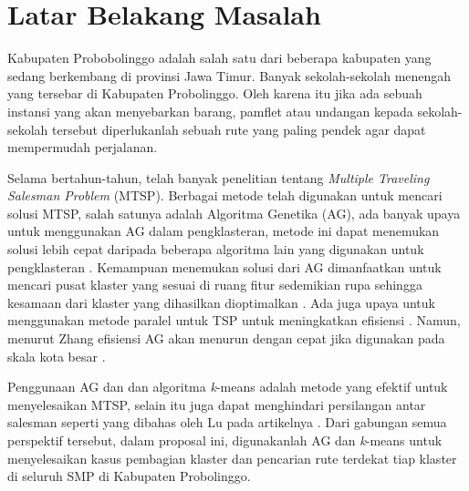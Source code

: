 
\section{Latar Belakang Masalah}

Kabupaten Probobolinggo adalah salah satu dari beberapa kabupaten yang sedang berkembang di provinsi Jawa Timur. Banyak sekolah-sekolah menengah yang tersebar di Kabupaten Probolinggo. Oleh karena itu jika ada sebuah instansi yang akan menyebarkan barang, pamflet atau undangan kepada sekolah-sekolah tersebut diperlukanlah sebuah rute yang paling pendek agar dapat mempermudah perjalanan.

Selama bertahun-tahun, telah banyak penelitian tentang \textit{Multiple Traveling Salesman Problem} (MTSP). Berbagai metode telah digunakan untuk mencari solusi MTSP, salah satunya adalah Algoritma Genetika (AG), ada banyak upaya untuk menggunakan AG dalam pengklasteran, metode ini dapat menemukan solusi lebih cepat daripada beberapa algoritma lain yang digunakan untuk pengklasteran \cite{krishna1999genetic}. Kemampuan menemukan solusi dari AG dimanfaatkan untuk mencari pusat klaster yang sesuai di ruang fitur sedemikian rupa sehingga kesamaan dari klaster yang dihasilkan dioptimalkan \cite{maii2000genetic}. Ada juga upaya untuk menggunakan metode paralel untuk TSP untuk meningkatkan efisiensi \cite{li2016parallel}. Namun, menurut Zhang efisiensi AG akan menurun dengan cepat jika digunakan pada skala kota besar \cite{zhang2014parallel}. 

Penggunaan AG dan dan algoritma \textit{k}-means adalah metode yang efektif untuk menyelesaikan MTSP, selain itu juga dapat menghindari persilangan antar salesman seperti yang dibahas oleh Lu pada artikelnya \cite{inproceedings}. Dari gabungan semua perspektif tersebut, dalam proposal ini, digunakanlah AG dan \textit{k}-means untuk menyelesaikan kasus pembagian klaster dan pencarian rute terdekat tiap klaster di seluruh SMP di Kabupaten Probolinggo.